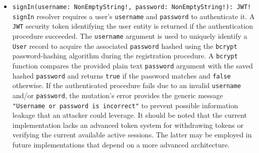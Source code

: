 \begin{itemize}
  \item \lstinline[language=graphql, morekeywords={[2]{NonEmptyString, JWT}}, morekeywords={[4]{password, username}},
    morekeywords={[5]{signIn}}]{signIn(username: NonEmptyString!, password: NonEmptyString!): JWT!}
    \newline
    \texttt{signIn} resolver requires a user's \texttt{username} and \texttt{password}
    to authenticate it. A \texttt{JWT} security token identifying the user entity
    is returned if the authentication procedure succeeded.
    \newline
    The \texttt{username} argument is used to uniquely identify a \texttt{User}
    record to acquire the associated \texttt{password} hashed using the \texttt{bcrypt}
    password-hashing algorithm during the registration procedure. A \texttt{bcrypt}
    function compares the provided plain text \texttt{password} argument with the
    saved hashed \texttt{password} and returns \texttt{true} if the password matches
    and \texttt{false} otherwise.
    \newline
    If the authenticated procedure fails due to an invalid \texttt{username} and/or
    \texttt{password}, the mutation's error provides the generic message \texttt{"Username
    or password is incorrect"} to prevent possible information leakage that an attacker
    could leverage.
    \newline
    It should be noted that the current implementation lacks an advanced token
    system for withdrawing tokens or verifying the current available active
    sessions. The latter may be employed in future implementations that depend on
    a more advanced architecture.


\end{itemize}
